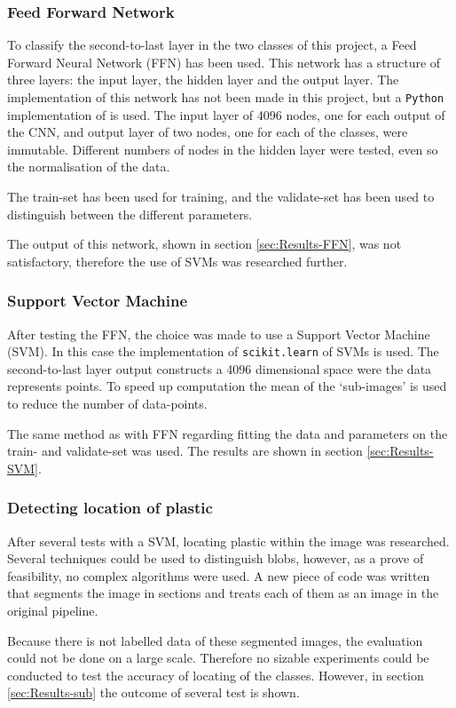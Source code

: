 
\subsubsection{Feed Forward Network}
\label{sec:Method-FFN}
To classify the second-to-last layer in the two classes of this project, a Feed Forward Neural Network (FFN) has been used.
This network has a structure of three layers: the input layer, the hidden layer and the output layer.
The implementation of this network has not been made in this project, but a \texttt{Python} implementation of \citeneed is used.
The input layer of 4096 nodes, one for each output of the CNN, and output layer of two nodes, one for each of the classes, were immutable.
Different numbers of nodes in the hidden layer were tested, even so the normalisation of the data.

The train-set has been used for training, and the validate-set has been used to distinguish between the different parameters.

The output of this network, shown in section \ref{sec:Results-FFN}, was not satisfactory, therefore the use of SVMs was researched further.

\subsubsection{Support Vector Machine}
\label{sec:Method-SVM}
After testing the FFN, the choice was made to use a Support Vector Machine (SVM).
In this case the implementation of \texttt{scikit.learn} of SVMs is used.
The second-to-last layer output constructs a 4096 dimensional space were the data represents points.
To speed up computation the mean of the `sub-images' is used to reduce the number of data-points.

The same method as with FFN regarding fitting the data and parameters on the train- and validate-set was used.
The results are shown in section \ref{sec:Results-SVM}.

\subsubsection{Detecting location of plastic}
\label{sec:Method-sub}
After several tests with a SVM, locating plastic within the image was researched.
Several techniques could be used to distinguish blobs, however, as a prove of feasibility, no complex algorithms were used.
A new piece of code was written that segments the image in sections and treats each of them as an image in the original pipeline.

Because there is not labelled data of these segmented images, the evaluation could not be done on a large scale.
Therefore no sizable experiments could be conducted to test the accuracy of locating of the classes.
However, in section \ref{sec:Results-sub} the outcome of several test is shown.

\fi